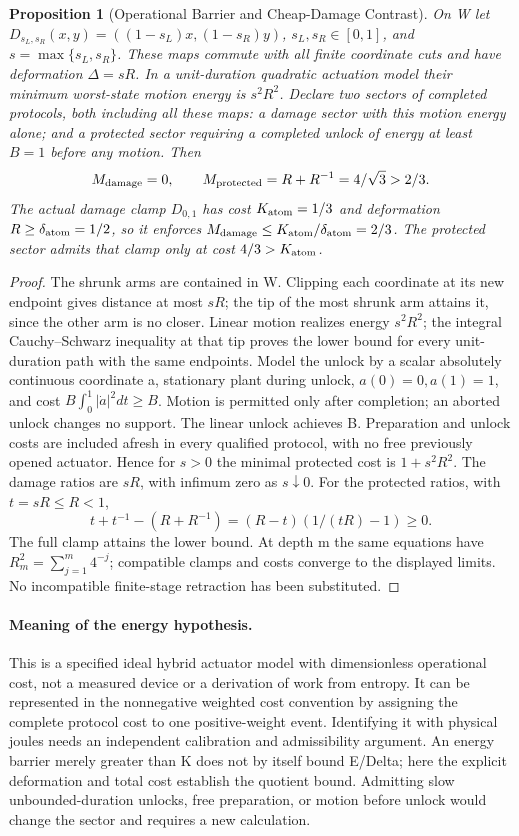\documentclass[11pt,a4paper]{article}
\theoremstyle{plain}
\newtheorem{proposition}[theorem]{Proposition}
\theoremstyle{definition}
\theoremstyle{remark}
\begin{document}
\begin{proposition}[Operational Barrier and Cheap-Damage Contrast]
\label{prop:wedge-energy-regimes}
On W let $D_{s_L,s_R}(x,y)=((1-s_L)x,(1-s_R)y)$,
$s_L,s_R\in[0,1]$, and $s=\max\{s_L,s_R\}$. These maps commute with all
finite coordinate cuts and have deformation $\Delta=sR$. In a unit-duration
quadratic actuation model their minimum worst-state motion energy is
$s^2R^2$. Declare two sectors of completed protocols, both including all these
maps: a damage sector with this motion energy alone; and a protected sector
requiring a completed unlock of energy at least $B=1$ before any motion.
Then
\[
 M_{\rm damage}=0,\qquad
 M_{\rm protected}=R+R^{-1}=4/\sqrt3>2/3.
\]
The actual damage clamp $D_{0,1}$ has cost $K_{\rm atom}=1/3$ and
deformation $R\ge\delta_{\rm atom}=1/2$, so it enforces
$M_{\rm damage}\le K_{\rm atom}/\delta_{\rm atom}=2/3$.
The protected sector admits that clamp only at cost $4/3>K_{\rm atom}$.
\end{proposition}
\begin{proof}
The shrunk arms are contained in W. Clipping each coordinate at its new
endpoint gives distance at most $sR$; the tip of the most shrunk arm attains
it, since the other arm is no closer. Linear motion realizes energy
$s^2R^2$; the integral Cauchy--Schwarz inequality at that tip proves the lower
bound for every unit-duration path with the same endpoints. Model the unlock
by a scalar absolutely continuous coordinate a, stationary plant during
unlock, $a(0)=0,a(1)=1$, and cost $B\int_0^1|\dot a|^2dt\ge B$.
Motion is permitted only after completion; an aborted unlock changes no
support. The linear unlock achieves B. Preparation and unlock costs are
included afresh in every qualified protocol, with no free previously opened
actuator. Hence for $s>0$ the minimal protected cost is $1+s^2R^2$.
The damage ratios are $sR$, with infimum zero as $s\downarrow0$.
For the protected ratios, with $t=sR\le R<1$,
\[
 t+t^{-1}-(R+R^{-1})=(R-t)(1/(tR)-1)\ge0.
\]
The full clamp attains the lower bound. At depth m the same equations have
$R_m^2=\sum_{j=1}^m4^{-j}$; compatible clamps and costs converge to the
displayed limits. No incompatible finite-stage retraction has been substituted.
\end{proof}

\paragraph{Meaning of the energy hypothesis.}
This is a specified ideal hybrid actuator model with dimensionless operational
cost, not a measured device or a derivation of work from entropy. It can be
represented in the nonnegative weighted cost convention by assigning the
complete protocol cost to one positive-weight event. Identifying it with
physical joules needs an independent calibration and admissibility argument.
An energy barrier merely greater than K does not by itself bound E/Delta;
here the explicit deformation and total cost establish the quotient bound.
Admitting slow unbounded-duration unlocks, free preparation, or motion before
unlock would change the sector and requires a new calculation.
\end{document}
